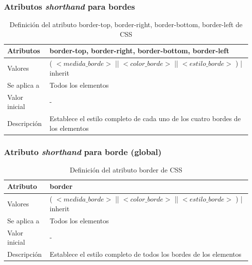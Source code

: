 \documentclass[ucs]{beamer}
\begin{document}

\begin{frame}
\frametitle{Atributos \emph{shorthand} para bordes}

\begin{center}
  \begin{table}
   \begin{tabular}{p{1.8cm}p{7.8cm}}
Atributos &\bf{border-top}, \bf{border-right}, \bf{border-bottom}, \bf{border-left} \\ \hline
Valores & ( $<medida\_borde>$ || $<color\_borde>$ || $<estilo\_borde>$ ) | inherit \\ \hline
Se aplica a & Todos los elementos \\ \hline
Valor inicial & - \\ \hline
Descripción & Establece el estilo completo de cada uno de los cuatro bordes de los elementos \\ \hline
 \end{tabular}
   \caption{Definición del atributo border-top, border-right, border-bottom, border-left de CSS}
 \end{table}
\end{center}

\end{frame}


\begin{frame}
\frametitle{Atributo \emph{shorthand} para borde (global)}

\begin{center}
  \begin{table}
   \begin{tabular}{p{1.8cm}p{7.8cm}}
Atributo &\bf{border} \\ \hline
Valores & ( $<medida\_borde>$ || $<color\_borde>$ || $<estilo\_borde>$ ) | inherit \\ \hline
Se aplica a & Todos los elementos \\ \hline
Valor inicial & - \\ \hline
Descripción & Establece el estilo completo de todos los bordes de los elementos \\ \hline
 \end{tabular}
   \caption{Definición del atributo border de CSS}
 \end{table}
\end{center}

\end{frame}
\end{document}
